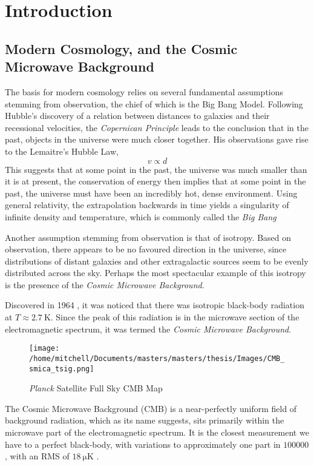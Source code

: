 \chapter{Introduction}
\section{Modern Cosmology, and the Cosmic Microwave Background}
The basis for modern cosmology relies on several fundamental assumptions stemming from observation, the chief of which is the Big Bang Model. Following Hubble's discovery of a relation between distances to galaxies and their recessional velocities, the \emph{Copernican Principle} leads to the conclusion that in the past, objects in the universe were much closer together. His observations gave rise to the Lemaitre's Hubble Law,
\begin{equation}
	v  \varpropto d
	\label{eq:HubbleLaw}
\end{equation}
This suggests that at some point in the past, the universe was much smaller than it is at present, the conservation of energy then implies that at some point in the past, the universe must have been an incredibly hot, dense environment. Using general relativity, the extrapolation backwards in time yields a singularity of infinite density and temperature, which is commonly called the \emph{Big Bang}
\par Another assumption stemming from observation is that of isotropy. Based on observation, there appears to be no favoured direction in the universe, since distributions of distant galaxies and other extragalactic sources seem to be evenly distributed across the sky. Perhaps the most spectacular example of this isotropy is the presence of the \emph{Cosmic Microwave Background}.
\par Discovered in 1964 \citep{Penzias:65}, it was noticed that there was isotropic black-body radiation at $T \approx \SI{2.7}{\kelvin}$. Since the peak of this radiation is in the microwave section of the electromagnetic spectrum, it was termed the \emph{Cosmic Microwave Background}.
\begin{figure}[ht]
	\centering
	\texttt{[image: /home/mitchell/Documents/masters/masters/thesis/Images/CMB\_smica\_tsig.png]}
	\label{CMB Map}
	\caption{\emph{Planck} Satellite Full Sky CMB Map}
\end{figure}

The Cosmic Microwave Background (CMB) is a near-perfectly uniform field of background radiation, which as its name suggests, sits primarily within the microwave part of the electromagnetic spectrum. It is the closest measurement we have to a perfect black-body, with variations to approximately one part in $100000$, with an RMS of $\SI{18}{\micro\kelvin}$ \cite{2004mmu..symp..291W}. 

